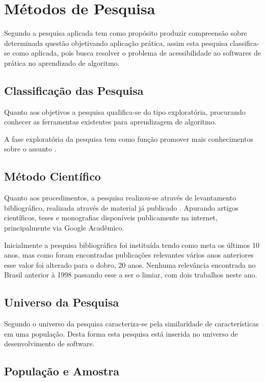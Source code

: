 \ifdraft{\color{green}}{}\chapter{Métodos de Pesquisa}

Segundo  a pesquisa aplicada tem como propósito produzir compreensão sobre determinada questão objetivando aplicação prática, assim esta pesquisa classifica-se como aplicada, pois busca resolver o problema de acessibilidade ao softwares de prática no aprendizado de algoritmo.

\section{Classificação das Pesquisa}

Quanto aos objetivos a pesquisa qualifica-se do tipo exploratória, procurando conhecer as ferramentas existentes para aprendizagem de algoritmo.

A fase exploratória da pesquisa tem como função  promover mais conhecimentos sobre o assunto \cite{prodanov2013etal}.

\section{Método Científico}

Quanto aos procedimentos, a pesquisa realizou-se através de levantamento bibliográfico, realizada através de material já publicado \cite{prodanov2013etal}. Apurando artigos científicos, teses e monografias disponíveis publicamente na internet, principalmente via Google Acadêmico.

Inicialmente a pesquisa bibliográfica foi instituída tendo como meta os últimos 10 anos, mas como foram encontradas publicações relevantes vários anos anteriores esse valor foi alterado para o dobro, 20 anos. Nenhuma relevância encontrada no Brasil anterior à 1998 passando esse a ser o limiar, com dois trabalhos neste ano.

\section{Universo da Pesquisa}

Segundo  o universo da pesquisa caracteriza-se pela similaridade de  características em uma população. Desta forma esta pesquisa está inserida no universo de desenvolvimento de software.

\section{População e Amostra}


